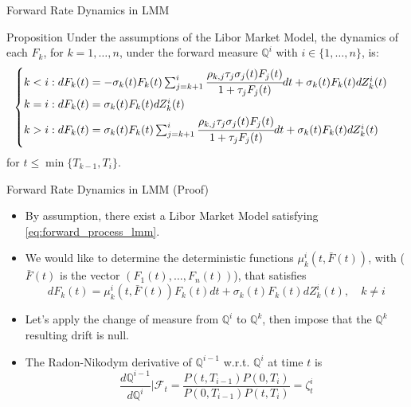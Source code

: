 \documentclass{beamer}
\begin{document}
\begin{frame}{Forward Rate Dynamics in LMM}
  \begin{block}{Proposition}
    Under the assumptions of the Libor Market Model, the dynamics of each $F_k$, for $k = 1,\ldots, n$, under the forward measure $\mathbb{Q}^i$ with $i \in \{1,\ldots, n\}$, is:
    \begin{equation}
      \begin{cases}
	k < i: dF_k(t) = -\sigma_k(t)F_k(t)\sum_{j=k+1}^i\cfrac{\rho_{k,j}\tau_j\sigma_j(t)F_j(t)}{1+\tau_jF_j(t)}dt + \sigma_k(t)F_k(t)dZ^i_k(t) \\ \vspace{0.1cm}
	k = i : dF_k(t) = \sigma_k(t)F_k(t)dZ_k^i(t) \\
	\vspace{0.1cm}
	k > i : dF_k(t) = \sigma_k(t)F_k(t)\sum_{j=k+1}^i\cfrac{\rho_{k,j}\tau_j\sigma_j(t)F_j(t)}{1+\tau_jF_j(t)}dt + \sigma_k(t)F_k(t)dZ^i_k(t)		
      \end{cases}
  	\label{eq:forward_rat_dynamics_lfm}
    \end{equation}
    for $t \le \min\{T_{k-1}, T_i\}$.
  \end{block}
\end{frame}

\begin{frame}{Forward Rate Dynamics in LMM (Proof)}
  \begin{itemize}
  \item<1-> By assumption, there exist a Libor Market Model satisfying \cref{eq:forward_process_lmm}.
  \item<2-> We would like to determine the deterministic functions $\mu_k^i(t, \bar{F}(t))$, with ($\bar{F}(t)$ is the vector $(F_1(t),\ldots, F_n(t))$), that satisfies
    \begin{equation}
      dF_k(t) = \mu_k^i(t, \bar{F}(t))F_k(t)dt + \sigma_k(t)F_k(t)dZ^i_k(t),\quad k\neq i
      \label{eq:forward_dynamics_in_lfm}
    \end{equation}
  \item<3-> Let's apply the change of measure from $\mathbb{Q}^i$ to $\mathbb{Q}^k$, then impose that the $\mathbb{Q}^k$ resulting drift is null. 
  \item<4-> The Radon-Nikodym derivative of $\mathbb{Q}^{i-1}$ w.r.t. $\mathbb{Q}^i$ at time $t$ is
    \begin{equation*}
      \frac{d\mathbb{Q}^{i-1}}{d\mathbb{Q}^i}\bigg|\mathcal{F}_t = \frac{P(t, T_{i-1})P(0, T_i)}{P(0, T_{i-1})P(t, T_i)} = \zeta^i_t
    \end{equation*}
  \end{itemize}
\end{frame}
\end{document}

